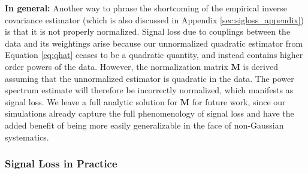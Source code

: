 \documentclass[preprint2,numberedappendix,tighten]{aastex6}
\newcommand{\dcj}[1]{{\color{orange} \textbf{[DCJ: #1]}}}
\begin{document}


{\bf In general:} Another way to phrase the shortcoming of the empirical inverse covariance estimator (which is also discussed in Appendix \ref{sec:sigloss_appendix}) is that it is not properly normalized. Signal loss due to couplings between the data and its weightings arise because our unnormalized quadratic estimator from Equation \eqref{eq:qhat} ceases to be a quadratic quantity, and instead contains higher order powers of the data. However, the normalization matrix $\mathbf{M}$ is derived assuming that the unnormalized estimator is quadratic in the data. The power spectrum estimate will therefore be incorrectly normalized, which manifests as signal loss. We leave a full analytic solution for $\mathbf{M}$ for future work, since our simulations already capture the full phenomenology of signal loss and have the added benefit of being more easily generalizable in the face of non-Gaussian systematics.

\subsubsection{Signal Loss in Practice}
\label{sec:Practice}
\end{document}
